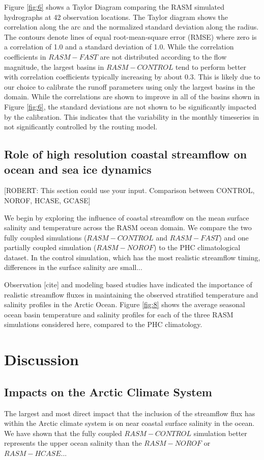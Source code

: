 \documentclass[jgrga, draft]{agutex}
\begin{document}
\begin{article}
Figure \ref{fig:6} shows a Taylor Diagram comparing the RASM simulated hydrographs at 42 observation locations.
The Taylor diagram shows the correlation along the arc and the normalized standard deviation along the radius.
The contours denote lines of equal root-mean-square error (RMSE) where zero is a correlation of 1.0 and a standard deviation of 1.0.
While the correlation coefficients in $RASM-FAST$ are not distributed according to the flow magnitude, the largest basins in $RASM-CONTROL$ tend to perform better with correlation coefficients typically increasing by about 0.3.
This is likely due to our choice to calibrate the runoff parameters using only the largest basins in the domain.
While the correlations are shown to improve in all of the basins shown in Figure \ref{fig:6}, the standard deviations are not shown to be significantly impacted by the calibration.
This indicates that the variability in the monthly timeseries in not significantly controlled by the routing model.

\subsection{Role of high resolution coastal streamflow on ocean and sea ice dynamics}
[ROBERT: This section could use your input. Comparison between CONTROL, NOROF, HCASE, GCASE]

We begin by exploring the influence of coastal streamflow on the mean surface salinity and temperature across the RASM ocean domain.
We compare the two fully coupled simulations ($RASM-CONTROL$ and $RASM-FAST$) and one partially coupled simulation ($RASM-NOROF$) to the PHC climatological dataset.
In the control simulation, which has the most realistic streamflow timing, differences in the surface salinity are small...

Observation [cite] and modeling \citep[e.g.][]{Nummelin_2015} based studies have indicated the importance of realistic streamflow fluxes in maintaining the observed stratified temperature and salinity profiles in the Arctic Ocean.
Figure \ref{fig:8} shows the average seasonal ocean basin temperature and salinity profiles for each of the three RASM simulations considered here, compared to the PHC climatology.

\section{Discussion}

\subsection{Impacts on the Arctic Climate System}
The largest and most direct impact that the inclusion of the streamflow flux has within the Arctic climate system is on near coastal surface salinity in the ocean.
We have shown that the fully coupled $RASM-CONTROL$ simulation better represents the upper ocean salinity than the $RASM-NOROF$ or $RASM-HCASE$...


\end{article}
\end{document}
